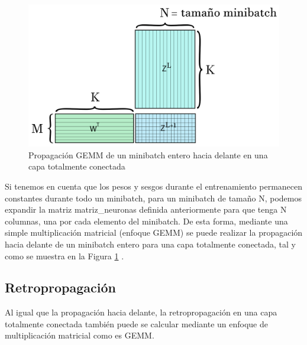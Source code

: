 \begin{figure}[H]
	\centering
	\includegraphics[scale=0.25]{imagenes/gemm_fully_forward_minibatch.jpg}  
	\caption{Propagación GEMM de un minibatch entero hacia delante en una capa totalmente conectada}
	\label{fig:gemm_fully_forward_minibatch}
\end{figure}

Si tenemos en cuenta que los pesos y sesgos durante el entrenamiento permanecen constantes durante todo un minibatch, para un minibatch de tamaño N, podemos expandir la matriz matriz\_neuronas definida anteriormente para que tenga N columnas, una por cada elemento del minibatch. De esta forma, mediante una simple multiplicación matricial (enfoque GEMM) se puede realizar la propagación hacia delante de un minibatch entero para una capa totalmente conectada, tal y como se muestra en la Figura \ref{fig:gemm_fully_forward_minibatch} \cite{nvidia_back_fully_GEMM}.

\newpage

\subsection{Retropropagación}

Al igual que la propagación hacia delante, la retropropagación en una capa totalmente conectada también puede se calcular mediante un enfoque de multiplicación matricial como es GEMM.

